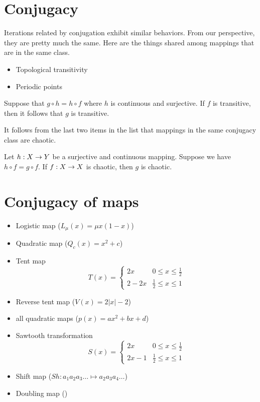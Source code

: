\documentclass[11pt]{book}
\begin{document}
\section{Conjugacy}
Iterations related by conjugation exhibit similar behaviors. From our perspective, they are pretty much the same.
Here are the things shared among mappings that are in the same class.
\begin{itemize}
  \item Topological transitivity
  \item Periodic points
\end{itemize}
\begin{proposition}
  Suppose that $g\circ h = h\circ f$ where $h$ is continuous and surjective. If $f$ is transitive,
  then it follows that $g$ is transitive.
\end{proposition}

It follows from the last two items in the list that mappings in the same conjugacy class are chaotic.
\begin{proposition}
  Let $h: X\rightarrow Y$ be a surjective and continuous mapping. Suppose we have $h\circ f = g\circ f$. If $f: X\rightarrow X$ is chaotic,
  then $g$ is chaotic.
\end{proposition}

\section{Conjugacy of maps}

\begin{itemize}
  \item Logistic map ($L_\mu(x) = \mu x(1-x)$)
  \item Quadratic map ($Q_c(x) = x^2 + c$)
  \item Tent map 
    \begin{equation*}
      T(x) = 
      \begin{cases}
        2x & 0 \leq x \leq \frac{1}{2}      \\
        2 - 2x & \frac{1}{2} \leq x \leq 1
      \end{cases}
    \end{equation*}
  \item Reverse tent map ($V(x) = 2|x| - 2$)
  \item all quadratic maps ($p(x) = ax^2 + bx + d$)
  \item Sawtooth transformation 
    \begin{equation*}
      S(x) = 
      \begin{cases}
        2x     & 0 \leq x \leq \frac{1}{2}      \\
        2x - 1 & \frac{1}{2} \leq x \leq 1
      \end{cases}
    \end{equation*}
  \item Shift map ($Sh: a_1a_2a_3\ldots \mapsto a_2a_3a_4\ldots$)
  \item Doubling map ()
\end{itemize}
\end{document}
